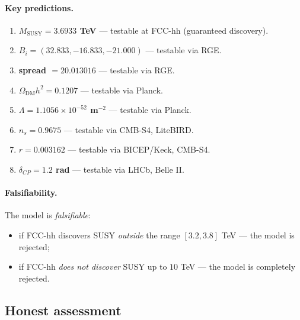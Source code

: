 \documentclass[11pt,a4paper]{article}
\newcommand{\MSUSY}{M_{\text{SUSY}}}
\theoremstyle{definition}
\begin{document}
\paragraph{Key predictions.}
\begin{enumerate}
    \item \textbf{$\MSUSY = 3.6933$ TeV} — testable at FCC-hh 
          (guaranteed discovery).
    \item \textbf{$B_i = (32.833, -16.833, -21.000)$} — 
          testable via RGE.
    \item \textbf{spread $= 20.013016$} — testable via RGE.
    \item \textbf{$\Omega_{\text{DM}} h^2 = 0.1207$} — 
          testable via Planck.
    \item \textbf{$\Lambda = 1.1056 \times 10^{-52}$ m$^{-2}$} — 
          testable via Planck.
    \item \textbf{$n_s = 0.9675$} — testable via CMB-S4, 
          LiteBIRD.
    \item \textbf{$r = 0.003162$} — testable via BICEP/Keck, 
          CMB-S4.
    \item \textbf{$\delta_{CP} = 1.2$ rad} — testable via 
          LHCb, Belle II.
\end{enumerate}

\paragraph{Falsifiability.}
The model is \emph{falsifiable}:
\begin{itemize}
    \item if FCC-hh discovers SUSY \emph{outside} the range 
          $[3.2, 3.8]$ TeV — the model is rejected;
    \item if FCC-hh \emph{does not discover} SUSY up to $10$ TeV — 
          the model is completely rejected.
\end{itemize}

\subsection{Honest assessment}
\label{subsec:conclusions-honest}
\end{document}
